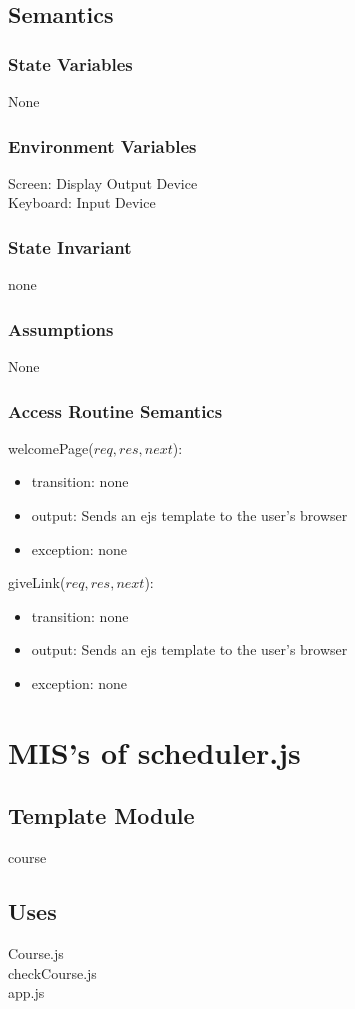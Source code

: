 \documentclass[11pt, oneside]{article}
\begin{document}
\subsection* {Semantics}
\subsubsection* {State Variables}
None
\subsubsection*{Environment Variables}
Screen: Display Output Device \\
Keyboard: Input Device \\

\subsubsection* {State Invariant}
none
\subsubsection* {Assumptions}
None
\subsubsection* {Access Routine Semantics}
welcomePage($req, res, next$):
\begin{itemize}
\item transition: none
\item output: Sends an ejs template to the user's browser
\item exception:
 none
\end{itemize}
\noIndent
giveLink($req, res, next$):
\begin{itemize}
\item transition: none
\item output: Sends an ejs template to the user's browser
\item exception:
 none
\end{itemize}
\newpage

\section{MIS's of scheduler.js}
\subsection*{Template Module}
course
\subsection* {Uses}
Course.js \\
checkCourse.js \\
app.js \\
\end{document}

